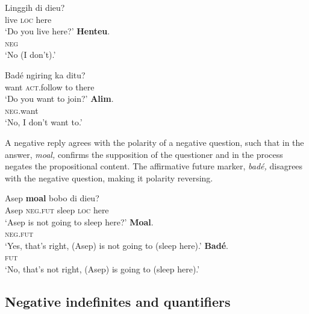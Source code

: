 \documentclass[output=paper]{langscibook}
\begin{document}
\ea\label{ex:sun:35a}
    \begin{xlist}
    \label{ex:sun:35a1}
        \gll  Linggih di dieu?\\ 
              live \textsc{loc} here\\ 
        \glt ‘Do you live here?’
    \label{ex:sun:35a2}
        \gll  \textbf{Henteu}.\\ 
               \textsc{neg}\\
        \glt  ‘No (I don’t).’
    \end{xlist}
\z
\ea\label{ex:sun:35b}
    \begin{xlist}
    \label{ex:sun:35b1}
        \gll  Badé ngiring ka ditu?\\ 
              want \textsc{act}.follow to there\\ 
        \glt‘Do you want to join?’ 
    \label{ex:sun:35b2}
        \gll  \textbf{Alim}.\\ 
                \textsc{neg}.want\\
        \glt ‘No, I don’t want to.’
    \end{xlist}
\z  

A negative reply agrees with the polarity of a negative question, such that in  the answer, \textit{moal,} confirms the supposition of the questioner and in the process negates the propositional content. The affirmative future marker, \textit{badé,} disagrees with the negative question, making it polarity reversing. 

 
\ea\label{ex:sun:36}
    \begin{xlist}[A2: ]
    \label{ex:sun:36A}
        \gll  Asep \textbf{moal} bobo di dieu?\\ 
              Asep \textsc{neg}.\textsc{fut} sleep \textsc{loc} here\\ 
        \glt ‘Asep is not going to sleep here?’
    \label{ex:sun:36B1}
        \gll  \textbf{Moal}.\\ 
               \textsc{neg}.\textsc{fut}\\
        \glt ‘Yes, that’s right, (Asep) is not going to (sleep here).’ 
    \label{ex:sun:36B2}
        \gll  \textbf{Badé}.\\ 
              \textsc{fut}\\
        \glt ‘No, that’s not right, (Asep) is going to (sleep here).’
    \end{xlist}
\z

\subsection{Negative indefinites and quantifiers}\label{sec:sun:3.2}
\end{document}
